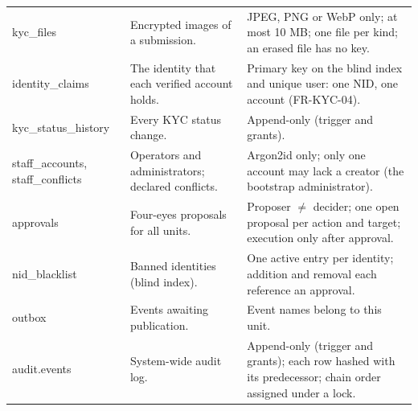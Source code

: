 \documentclass[11pt,a4paper]{article}
\newenvironment{dtable}[1]{\small\begin{longtable}{#1}}{\end{longtable}}
\begin{document}
\begin{dtable}{@{}>{\ttfamily\raggedright\arraybackslash}p{3.6cm}>{\raggedright\arraybackslash}p{5.2cm}>{\raggedright\arraybackslash}p{6.4cm}@{}}
kyc\_files & Encrypted images of a submission. & JPEG, PNG or WebP only; at most 10 MB; one file per kind; an erased file has no key. \\
identity\_claims & The identity that each verified account holds. & Primary key on the blind index and unique user: one NID, one account (FR-KYC-04). \\
kyc\_status\_history & Every KYC status change. & Append-only (trigger and grants). \\
staff\_accounts, staff\_conflicts & Operators and administrators; declared conflicts. & Argon2id only; only one account may lack a creator (the bootstrap administrator). \\
approvals & Four-eyes proposals for all units. & Proposer $\ne$ decider; one open proposal per action and target; execution only after approval. \\
nid\_blacklist & Banned identities (blind index). & One active entry per identity; addition and removal each reference an approval. \\
outbox & Events awaiting publication. & Event names belong to this unit. \\
audit.events & System-wide audit log. & Append-only (trigger and grants); each row hashed with its predecessor; chain order assigned under a lock. \\
\bottomrule
\end{dtable}
\end{document}
